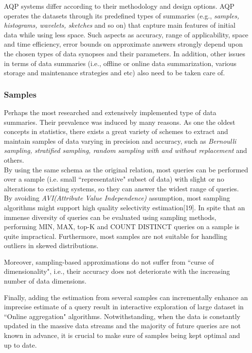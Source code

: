 \documentclass[10pt, conference, compsocconf]{IEEEtran}
\begin{document}
AQP systems differ according to their methodology and design options. AQP operates the datasets through its predefined types of summaries (e.g., \textit{samples, histograms, wavelets, sketches} and so on) that capture main features of initial data while using less space. Such aspects as accuracy, range of applicability, space and time efficiency, error bounds on approximate answers strongly depend upon the chosen types of data synopses and their parameters. In addition, other issues in terms of data summaries (i.e., offline or online data summarization, various storage and maintenance strategies and etc) also need to be taken care of.\\

\subsubsection{\textbf{Samples}}

Perhaps the most researched and extensively implemented type of data summaries. Their prevalence was induced by many reasons. As one the oldest concepts in statistics, there exists a great variety of schemes to extract and maintain samples of data varying in precision and accuracy, such as \textit{Bernoulli sampling, stratified sampling, random sampling with and without replacement} and others. \\
By using the same schema as the original relation, most queries can be performed over a sample (i.e. small ``representative" subset of data) with slight or no alterations to existing systems, so they can answer the widest range of queries. By avoiding \textit{AVI(Attribute Value Independence)} assumption, most sampling algorithms might support high quality selectivity estimation[19]. In spite that an immense diversity of queries can be evaluated using sampling methods, performing MIN, MAX, top-K and COUNT DISTINCT queries on a sample is quite impractical. Furthermore, most samples are not suitable for handling outliers in skewed distributions. 

Moreover, sampling-based approximations do not suffer from ``curse of dimensionality", i.e., their accuracy does not deteriorate with the increasing number of data dimensions. 

Finally, adding the estimation from several samples can incrementally enhance an imprecise estimate of a query result in interactive exploration of large dataset in ``Online aggregation" algorithms. Notwithstanding, when the data is constantly updated in the massive data streams and the majority of future queries are not known in advance, it is crucial to make sure of samples being kept optimal and up to date. \\
\end{document}

